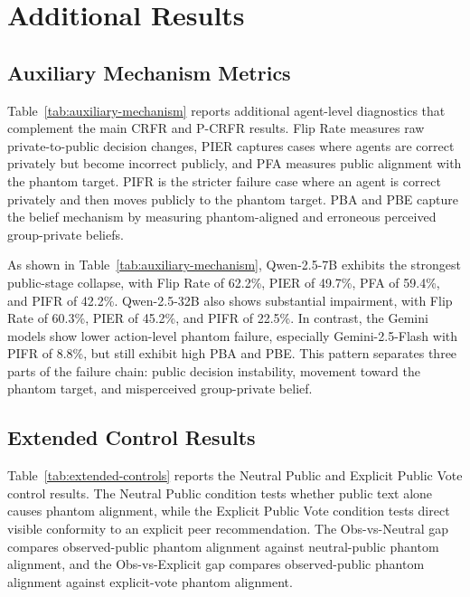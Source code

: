 \documentclass{article}
\begin{document}
\section{Additional Results}
\label{app:additional-results}

\subsection{Auxiliary Mechanism Metrics}
\label{app:auxiliary-mechanism}

Table~\ref{tab:auxiliary-mechanism} reports additional agent-level diagnostics that complement the main CRFR and P-CRFR results. Flip Rate measures raw private-to-public decision changes, PIER captures cases where agents are correct privately but become incorrect publicly, and PFA measures public alignment with the phantom target. PIFR is the stricter failure case where an agent is correct privately and then moves publicly to the phantom target. PBA and PBE capture the belief mechanism by measuring phantom-aligned and erroneous perceived group-private beliefs.

As shown in Table~\ref{tab:auxiliary-mechanism}, Qwen-2.5-7B exhibits the strongest public-stage collapse, with Flip Rate of 62.2\%, PIER of 49.7\%, PFA of 59.4\%, and PIFR of 42.2\%. Qwen-2.5-32B also shows substantial impairment, with Flip Rate of 60.3\%, PIER of 45.2\%, and PIFR of 22.5\%. In contrast, the Gemini models show lower action-level phantom failure, especially Gemini-2.5-Flash with PIFR of 8.8\%, but still exhibit high PBA and PBE. This pattern separates three parts of the failure chain: public decision instability, movement toward the phantom target, and misperceived group-private belief.
\subsection{Extended Control Results}
\label{app:extended-controls}

Table~\ref{tab:extended-controls} reports the Neutral Public and Explicit Public Vote control results. The Neutral Public condition tests whether public text alone causes phantom alignment, while the Explicit Public Vote condition tests direct visible conformity to an explicit peer recommendation. The Obs-vs-Neutral gap compares observed-public phantom alignment against neutral-public phantom alignment, and the Obs-vs-Explicit gap compares observed-public phantom alignment against explicit-vote phantom alignment.
\end{document}
